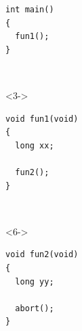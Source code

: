 
	  \begin{lstlisting}[basicstyle=\normalsize]
int main()
{
  fun1();
}
	  \end{lstlisting} \\[1em]

	  \begin{uncoverenv}<3->
	  \begin{lstlisting}[basicstyle=\normalsize]
void fun1(void)
{
  long xx;

  fun2();
}
	  \end{lstlisting}
	  \end{uncoverenv} \\[1em]

	  \begin{uncoverenv}<6->
	  \begin{lstlisting}[basicstyle=\normalsize]
void fun2(void)
{
  long yy;

  abort();
}
	  \end{lstlisting}
	  \end{uncoverenv} \\[1em]
